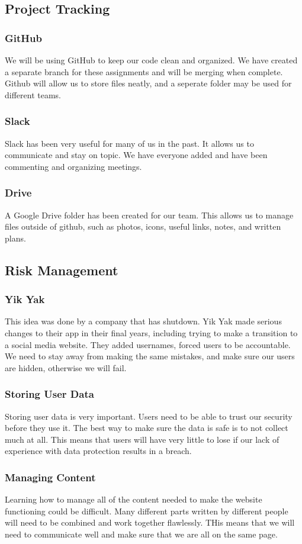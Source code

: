 \documentclass[12pt]{article}
\begin{document}
\subsection{Project Tracking}
\subsubsection{GitHub}
	We will be using GitHub to keep our code clean and organized. We have created a separate branch for these assignments and will be merging when complete. Github will allow us to store files neatly, and a seperate folder may be used for different teams.
\subsubsection{Slack}
	Slack has been very useful for many of us in the past. It allows us to communicate and stay on topic. We have everyone added and have been commenting and organizing meetings.
\subsubsection{Drive}
	A Google Drive folder has been created for our team. This allows us to manage files outside of github, such as photos, icons, useful links, notes, and written plans.

\subsection{Risk Management}
\subsubsection{Yik Yak}
	This idea was done by a company that has shutdown. Yik Yak made serious changes to their app in their final years, including trying to make a transition to a social media website. They added usernames, forced users to be accountable. We need to stay away from making the same mistakes, and make sure our users are hidden, otherwise we will fail.
\subsubsection{Storing User Data}
	Storing user data is very important. Users need to be able to trust our security before they use it. The best way to make sure the data is safe is to not collect much at all. This means that users will have very little to lose if our lack of experience with data protection results in a breach.
\subsubsection{Managing Content}
	Learning how to manage all of the content needed to make the website functioning could be difficult. Many different parts written by different people will need to be combined and work together flawlessly. THis means that we will need to communicate well and make sure that we are all on the same page.
\end{document}
